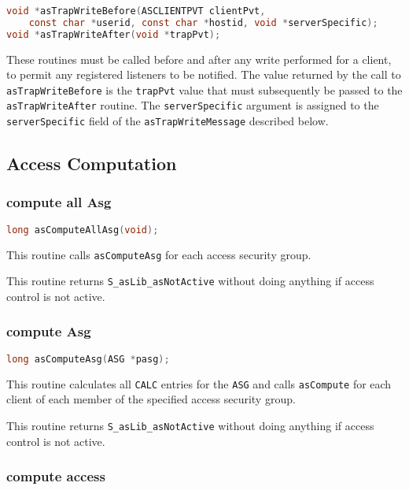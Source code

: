 \begin{lstlisting}[language=C]
void *asTrapWriteBefore(ASCLIENTPVT clientPvt,
    const char *userid, const char *hostid, void *serverSpecific);
void *asTrapWriteAfter(void *trapPvt);
\end{lstlisting}

These routines must be called before and after any write performed for a client, to permit any registered listeners to be notified.
The value returned by the call to \verb|asTrapWriteBefore| is the \verb|trapPvt| value that must subsequently be passed to the \verb|asTrapWriteAfter| routine.
The \verb|serverSpecific| argument is assigned to the \verb|serverSpecific| field of the \verb|asTrapWriteMessage| described below.

\subsection{Access Computation}

\subsubsection{compute all Asg}

\begin{lstlisting}[language=C]
long asComputeAllAsg(void);
\end{lstlisting}

This routine calls \verb|asComputeAsg| for each access security group.

This routine returns \verb|S_asLib_asNotActive| without doing anything if access control is not active.

\subsubsection{compute Asg}

\begin{lstlisting}[language=C]
long asComputeAsg(ASG *pasg); 
\end{lstlisting}

This routine calculates all \verb|CALC| entries for the \verb|ASG| and calls \verb|asCompute| for each client of each member of the specified access security group.

This routine returns \verb|S_asLib_asNotActive| without doing anything if access control is not active.

\subsubsection{compute access}

